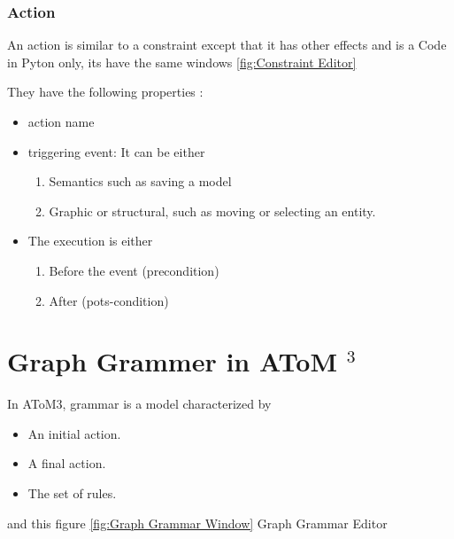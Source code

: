 \subsubsection{ Action }

An action is similar to a constraint except that it has other effects and is a
Code in Pyton only, its have the same windows \ref{fig:Constraint Editor} 

They have the following properties :
\begin{itemize}
\newcommand{\localtextbulletone}{\textcolor{gray}{\raisebox{.45ex}{\rule{.6ex}{.6ex}}}}
\renewcommand{\labelitemi}{\localtextbulletone}
\item action name
\item triggering event: It can be either
	\begin{enumerate}
	\item Semantics such as saving a model
	\item Graphic or structural, such as moving or selecting an entity.
	\end{enumerate}
	
\item The execution is either
	\begin{enumerate}
	\item Before the event (precondition)
	\item  After (pots-condition) 
	\end{enumerate}

\end{itemize}
 


\section{ Graph Grammer in AToM $^{3}$ }
In AToM3, grammar is a model characterized by
\begin{itemize}
\newcommand{\localtextbulletone}{\textcolor{gray}{\raisebox{.45ex}{\rule{.6ex}{.6ex}}}}
\renewcommand{\labelitemi}{\localtextbulletone}
\item An initial action.
\item A final action.
\item The set of rules. 
\end{itemize}
and this figure \ref{fig:Graph Grammar Window} Graph Grammar Editor
 
